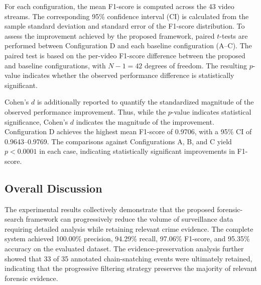 \documentclass[runningheads]{llncs}
\begin{document}
For each configuration, the mean F1-score is computed across the 43 video
streams. The corresponding 95\% confidence interval (CI) is calculated
from the sample standard deviation and standard error of the F1-score
distribution. To assess the improvement achieved by the proposed
framework, paired $t$-tests are performed between Configuration D and
each baseline configuration (A--C). The paired test is based on the
per-video F1-score difference between the proposed and baseline
configurations, with $N-1=42$ degrees of freedom. The resulting
$p$-value indicates whether the observed performance difference is
statistically significant.

Cohen's $d$ is additionally reported to quantify the standardized
magnitude of the observed performance improvement. Thus, while the
$p$-value indicates statistical significance, Cohen's $d$ indicates the
magnitude of the improvement. Configuration D achieves the highest mean
F1-score of 0.9706, with a 95\% CI of 0.9643--0.9769. The comparisons
against Configurations A, B, and C yield $p<0.0001$ in each case,
indicating statistically significant improvements in F1-score.

\begin{table}[htbp]
\centering
\caption{Statistical significance of progressive architectural improvements in F1-score.}
\label{tab:statistical_significance}
\end{table}

\subsection{Overall Discussion}

The experimental results collectively demonstrate that the proposed
forensic-search framework can progressively reduce the volume of
surveillance data requiring detailed analysis while retaining relevant
crime evidence. The complete system achieved 100.00\% precision,
94.29\% recall, 97.06\% F1-score, and 95.35\% accuracy on the evaluated
dataset. The evidence-preservation analysis further showed that 33 of
35 annotated chain-snatching events were ultimately retained, indicating
that the progressive filtering strategy preserves the majority of
relevant forensic evidence.
\end{document}
